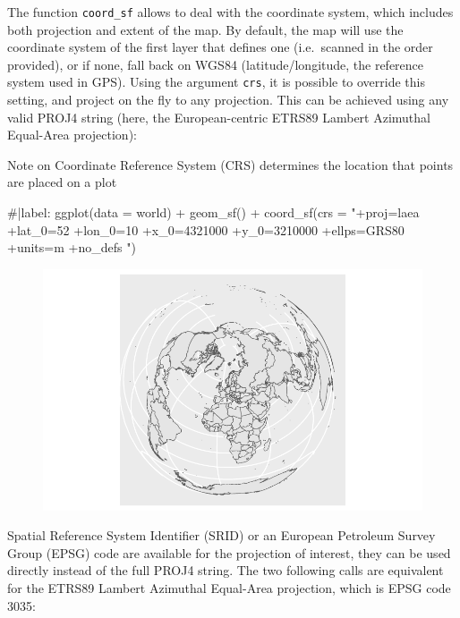 \documentclass[
  letterpaper,
  DIV=11,
  numbers=noendperiod]{scrartcl}
\newenvironment{Shaded}{\begin{snugshade}}{\end{snugshade}}
\newcommand{\AttributeTok}[1]{\textcolor[rgb]{0.40,0.45,0.13}{#1}}
\newcommand{\CommentTok}[1]{\textcolor[rgb]{0.37,0.37,0.37}{#1}}
\newcommand{\FunctionTok}[1]{\textcolor[rgb]{0.28,0.35,0.67}{#1}}
\newcommand{\NormalTok}[1]{\textcolor[rgb]{0.00,0.23,0.31}{#1}}
\newcommand{\SpecialCharTok}[1]{\textcolor[rgb]{0.37,0.37,0.37}{#1}}
\newcommand{\StringTok}[1]{\textcolor[rgb]{0.13,0.47,0.30}{#1}}
\begin{document}
The function \texttt{coord\_sf} allows to deal with the coordinate
system, which includes both projection and extent of the map. By
default, the map will use the coordinate system of the first layer that
defines one (i.e.~scanned in the order provided), or if none, fall back
on WGS84 (latitude/longitude, the reference system used in GPS). Using
the argument \texttt{crs}, it is possible to override this setting, and
project on the fly to any projection. This can be achieved using any
valid PROJ4 string (here, the European-centric ETRS89 Lambert Azimuthal
Equal-Area projection):

Note on Coordinate Reference System (CRS) determines the location that
points are placed on a plot

\begin{Shaded}
\begin{Highlighting}[]
\CommentTok{\#|label: }
\FunctionTok{ggplot}\NormalTok{(}\AttributeTok{data =}\NormalTok{ world) }\SpecialCharTok{+}     
  \FunctionTok{geom\_sf}\NormalTok{() }\SpecialCharTok{+}     
  \FunctionTok{coord\_sf}\NormalTok{(}\AttributeTok{crs =} \StringTok{"+proj=laea +lat\_0=52 +lon\_0=10 +x\_0=4321000 +y\_0=3210000 +ellps=GRS80 +units=m +no\_defs "}\NormalTok{)}
\end{Highlighting}
\end{Shaded}

\begin{figure}[H]

{\centering \includegraphics{Introduction-to-mapping_files/figure-pdf/unnamed-chunk-10-1.pdf}

}

\end{figure}

Spatial Reference System Identifier (SRID) or an European Petroleum
Survey Group (EPSG) code are available for the projection of interest,
they can be used directly instead of the full PROJ4 string. The two
following calls are equivalent for the ETRS89 Lambert Azimuthal
Equal-Area projection, which is EPSG code 3035:
\end{document}
